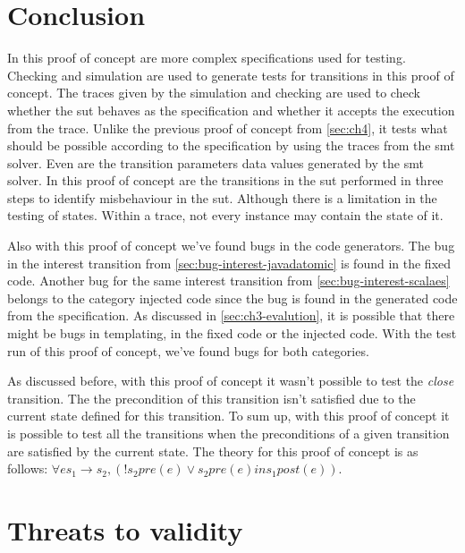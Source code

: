 
\section{Conclusion}
In this proof of concept are more complex specifications used for testing.
Checking and simulation are used to generate tests for transitions in this proof
of concept. The traces given by the simulation and checking are used to check
whether the \gls{sut} behaves as the specification and whether it accepts the
execution from the trace. Unlike the previous proof of concept from
\autoref{sec:ch4}, it tests what should be possible according to the
specification by using the traces from the \gls{smt} solver. Even are the transition
parameters data values generated by the \gls{smt} solver. In this proof of concept are
the transitions in the \gls{sut} performed in three steps to identify misbehaviour in
the \gls{sut}. Although there is a limitation in the testing of states. Within a
trace, not every instance may contain the state of it.

Also with this proof of concept we've found bugs in the code generators. The bug
in the interest transition from \autoref{sec:bug-interest-javadatomic} is found
in the fixed code. Another bug for the same interest transition from
\autoref{sec:bug-interest-scalaes} belongs to the category injected code since
the bug is found in the generated code from the specification. As discussed in
\autoref{sec:ch3-evalution}, it is possible that there might be bugs in
templating, in the fixed code or the injected code. With the test run of this
proof of concept, we've found bugs for both categories.

As discussed before, with this proof of concept it wasn't possible to test the
\textit{close} transition. The the precondition of this transition isn't
satisfied due to the current state defined for this transition. To sum up, with
this proof of concept it is possible to test all the transitions when the
preconditions of a given transition are satisfied by the current state. The
theory for this proof of concept is as follows:
$\forall e s_{1} \to s_{2}, (! s_{2} pre(e) \lor s_{2} pre(e) in s_{1} post(e))$.


\section{Threats to validity}

